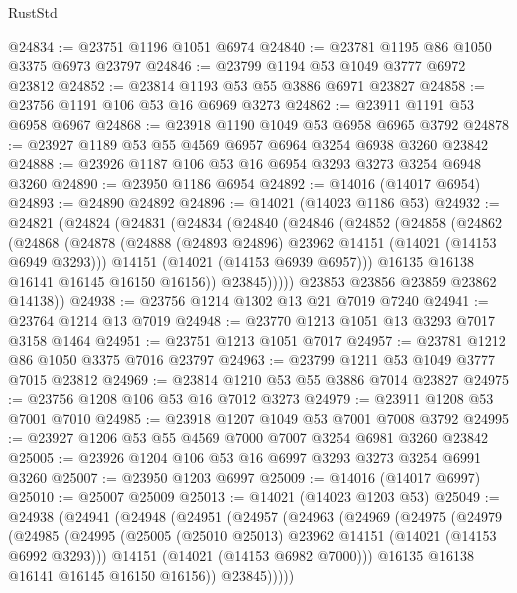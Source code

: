 \begin{lexlean}{RustStd}
\begin{coremodule}
@24834 := @23751 @1196 @1051 @6974
@24840 := @23781 @1195 @86 @1050 @3375 @6973 @23797
@24846 := @23799 @1194 @53 @1049 @3777 @6972 @23812
@24852 := @23814 @1193 @53 @55 @3886 @6971 @23827
@24858 := @23756 @1191 @106 @53 @16 @6969 @3273
@24862 := @23911 @1191 @53 @6958 @6967
@24868 := @23918 @1190 @1049 @53 @6958 @6965 @3792
@24878 := @23927 @1189 @53 @55 @4569 @6957 @6964 @3254 @6938 @3260 @23842
@24888 := @23926 @1187 @106 @53 @16 @6954 @3293 @3273 @3254 @6948 @3260
@24890 := @23950 @1186 @6954
@24892 := @14016 (@14017 @6954)
@24893 := @24890 @24892
@24896 := @14021 (@14023 @1186 @53)
@24932 := @24821
    (@24824
      (@24831
        (@24834
          (@24840
            (@24846
              (@24852
                (@24858
                  (@24862
                    (@24868
                      (@24878
                        (@24888 (@24893 @24896) @23962 @14151 (@14021 (@14153 @6949 @3293)))
                        @14151
                        (@14021 (@14153 @6939 @6957)))
                      @16135
                      @16138
                      @16141
                      @16145
                      @16150
                      @16156))
                  @23845)))))
        @23853
        @23856
        @23859
        @23862
        @14138))
@24938 := @23756 @1214 @1302 @13 @21 @7019 @7240
@24941 := @23764 @1214 @13 @7019
@24948 := @23770 @1213 @1051 @13 @3293 @7017 @3158 @1464
@24951 := @23751 @1213 @1051 @7017
@24957 := @23781 @1212 @86 @1050 @3375 @7016 @23797
@24963 := @23799 @1211 @53 @1049 @3777 @7015 @23812
@24969 := @23814 @1210 @53 @55 @3886 @7014 @23827
@24975 := @23756 @1208 @106 @53 @16 @7012 @3273
@24979 := @23911 @1208 @53 @7001 @7010
@24985 := @23918 @1207 @1049 @53 @7001 @7008 @3792
@24995 := @23927 @1206 @53 @55 @4569 @7000 @7007 @3254 @6981 @3260 @23842
@25005 := @23926 @1204 @106 @53 @16 @6997 @3293 @3273 @3254 @6991 @3260
@25007 := @23950 @1203 @6997
@25009 := @14016 (@14017 @6997)
@25010 := @25007 @25009
@25013 := @14021 (@14023 @1203 @53)
@25049 := @24938
    (@24941
      (@24948
        (@24951
          (@24957
            (@24963
              (@24969
                (@24975
                  (@24979
                    (@24985
                      (@24995
                        (@25005 (@25010 @25013) @23962 @14151 (@14021 (@14153 @6992 @3293)))
                        @14151
                        (@14021 (@14153 @6982 @7000)))
                      @16135
                      @16138
                      @16141
                      @16145
                      @16150
                      @16156))
                  @23845)))))

\end{coremodule}
\end{lexlean}
